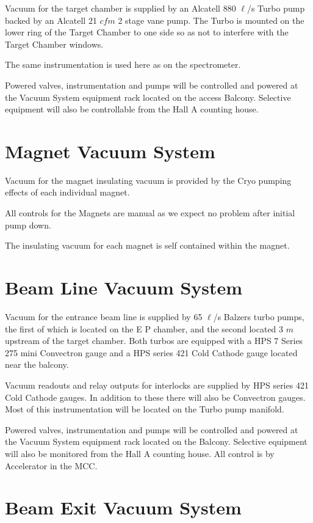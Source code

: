 {Vacuum for the target chamber is supplied by an Alcatell 880 $\ell$/s 
Turbo pump backed by an Alcatell 21 $cfm$ 2 stage vane pump.  The Turbo is 
mounted on the lower ring of the Target Chamber to one side so as not to 
interfere with the Target Chamber windows.

The same instrumentation is used here as on the spectrometer.

Powered valves, instrumentation and pumps will be controlled and powered 
at the Vacuum System equipment rack located on the access Balcony.  
Selective equipment will also be controllable from the Hall A counting 
house. 

\section{Magnet Vacuum System}

Vacuum for the magnet insulating vacuum is provided by the Cryo
pumping effects of each individual magnet.

All controls for the Magnets are manual as we expect no problem after 
initial pump down.


The insulating vacuum for each magnet is self contained within the 
magnet.

\section{Beam Line Vacuum System}

Vacuum for the entrance beam line is supplied by 65 $\ell$/s Balzers turbo
pumps, the first of which is located on the E P chamber, and the
second located 3 $m$ upstream of the target chamber.  Both turbos
are equipped with a HPS 7 Series 275 mini Convectron gauge and a HPS
series 421 Cold Cathode gauge located near the balcony.

Vacuum readouts and relay outputs for interlocks are supplied by HPS series 421 
Cold Cathode gauges.  In addition to these there will also be Convectron 
gauges.  Most of this instrumentation will be located on the Turbo pump 
manifold.

Powered valves, instrumentation and pumps will be controlled and powered 
at the Vacuum System equipment rack located on the Balcony.  Selective 
equipment will also be monitored from the Hall A counting house.  All 
control is by Accelerator in the MCC.

\section{Beam Exit Vacuum System}

}
